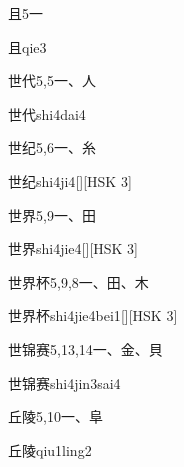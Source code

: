 \begin{entry}{且}{5}{⼀}
  \begin{phonetics}{且}{qie3}
  \end{phonetics}
\end{entry}

\begin{entry}{世代}{5,5}{⼀、⼈}
  \begin{phonetics}{世代}{shi4dai4}
  \end{phonetics}
\end{entry}

\begin{entry}{世纪}{5,6}{⼀、⽷}
  \begin{phonetics}{世纪}{shi4ji4}[][HSK 3]
  \end{phonetics}
\end{entry}

\begin{entry}{世界}{5,9}{⼀、⽥}
  \begin{phonetics}{世界}{shi4jie4}[][HSK 3]
  \end{phonetics}
\end{entry}

\begin{entry}{世界杯}{5,9,8}{⼀、⽥、⽊}
  \begin{phonetics}{世界杯}{shi4jie4bei1}[][HSK 3]
  \end{phonetics}
\end{entry}

\begin{entry}{世锦赛}{5,13,14}{⼀、⾦、⾙}
  \begin{phonetics}{世锦赛}{shi4jin3sai4}
  \end{phonetics}
\end{entry}

\begin{entry}{丘陵}{5,10}{⼀、⾩}
  \begin{phonetics}{丘陵}{qiu1ling2}
  \end{phonetics}
\end{entry}

